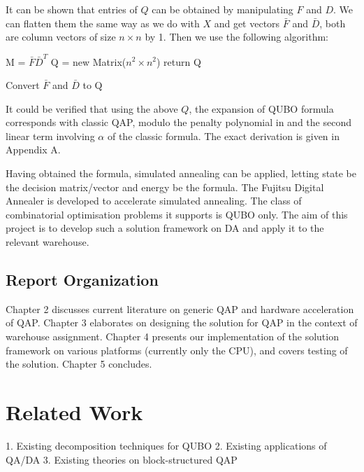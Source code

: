 \documentclass[hyp]{socreport}
\begin{document}
It can be shown that entries of $Q$ can be obtained by manipulating $F$ and $D$. We can flatten them the same way as we do with $X$ and get vectors $\bar{F}$ and $\bar{D}$, both are column vectors of size $n\times n$ by 1. Then we use the following algorithm:

\bigskip
\singlespacing
\begin{algorithm}[H]
\SetAlgoLined
{}
 M = $\bar{F}\bar{D}^T$\;
 Q = new Matrix($n^2\times n^2$)\;
 return Q\;
 \caption{Convert $\bar{F}$ and $\bar{D}$ to Q}
\label{algo1}
\end{algorithm}
\normalspacing
\bigskip

It could be verified that using the above $Q$, the expansion of QUBO formula corresponds with classic QAP, modulo the penalty polynomial in and the second linear term involving $\alpha$ of the classic formula. The exact derivation is given in Appendix A.

Having obtained the formula, simulated annealing can be applied, letting state be the decision matrix/vector and energy be the formula. The Fujitsu Digital Annealer is developed to accelerate simulated annealing. The class of combinatorial optimisation problems it supports is QUBO only. The aim of this project is to develop such a solution framework on DA and apply it to the relevant warehouse.

\section{Report Organization}
Chapter 2 discusses current literature on generic QAP and hardware acceleration of QAP. Chapter 3 elaborates on designing the solution for QAP in the context of warehouse assignment. Chapter 4 presents our implementation of the solution framework on various platforms (currently only the CPU), and covers testing of the solution. Chapter 5 concludes.

\chapter{Related Work}
\label{ch:related}
1. Existing decomposition techniques for QUBO
2. Existing applications of QA/DA
3. Existing theories on block-structured QAP
\end{document}
